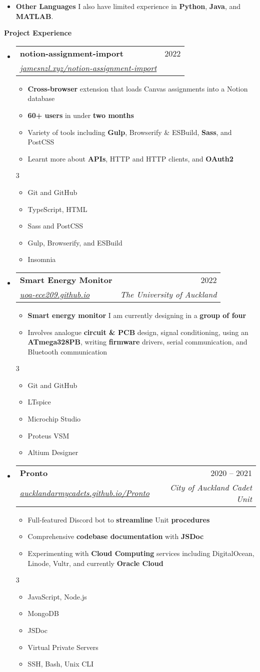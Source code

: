 \documentclass[11pt,a4paper]{article}[leftmargin=*]
\makeatletter
\def \entryspacing {-0pt}
\renewcommand{\section}[2]{\vspace{5pt}
  \colorbox{secondary}{\color{white}\raggedbottom\normalsize\textbf{{#1}{\hspace{2pt}#2}}}
}
\newcommand{\resumeEntryStart}{\begin{itemize}[leftmargin=2.5mm]}
\newcommand{\resumeEntryEnd}{\end{itemize}\vspace{\entryspacing}}
\newcommand{\resumeItemListStart}{\begin{itemize}[leftmargin=4.5mm]}
\newcommand{\resumeItemListEnd}{\end{itemize}}
\newcommand{\resumeItemListStartColumns}[2][-0.5]{\vspace*{#1\multicolsep}
\begin{multicols}{#2}\begin{itemize}[leftmargin=4.5mm]}
\newcommand{\resumeItemListEndColumns}[1][-1]{\end{itemize}\end{multicols}\vspace*{#1\multicolsep}}
\newcommand{\resumeItem}[1]{
  \item\small{
    {#1 \vspace{-2pt}}
  }
}
\newcommand{\resumeEntryTSDL}[4]{
  \vspace{-1pt}\item[]
    \begin{tabularx}{0.97\textwidth}{X@{\hspace{60pt}}r}
      \textbf{\color{primary}#1} & {\firabook\color{accent}\small#2} \\
      \textit{\color{accent}\small#3} & \textit{\color{accent}\small#4} \\
    \end{tabularx}\vspace{-6pt}
}
\newcommand{\resumeEntryS}[2]{
  \item[]\small{
    \textbf{\color{primary}#1 }{ #2 \vspace{-2pt}}
  }
}
\newcommand{\resumeBf}[1]{\small\textbf{\color{halfbold}#1}}
\makeatother
\begin{document}
\resumeEntryStart
\resumeEntryS
{Other Languages}{I also have limited experience in \resumeBf{Python}, \resumeBf{Java}, and \resumeBf{MATLAB}.}
\resumeEntryEnd


\section{\faFlask}{Project Experience}

\resumeEntryStart
\resumeEntryTSDL
{notion-assignment-import}{2022}
{\href{https://jamesnzl.xyz/notion-assignment-import}{jamesnzl.xyz/notion-assignment-import}}{}
\resumeItemListStart
\resumeItem {\resumeBf{Cross-browser} extension that loads Canvas assignments into a Notion database}
\resumeItem {\resumeBf{60+ users} in under \resumeBf{two months}}
\resumeItem {Variety of tools including \resumeBf{Gulp}, Browserify \& ESBuild, \resumeBf{Sass}, and PostCSS}
\resumeItem {Learnt more about \resumeBf{APIs}, HTTP and HTTP clients, and \resumeBf{OAuth2}}
\resumeItemListEnd
\resumeItemListStartColumns{3}
\resumeItem {Git and GitHub}
\resumeItem {TypeScript, HTML}
\resumeItem {Sass and PostCSS}
\resumeItem {Gulp, Browserify, and ESBuild}
\resumeItem {Insomnia}
\resumeItemListEndColumns
\resumeEntryEnd

\resumeEntryStart
\resumeEntryTSDL
{Smart Energy Monitor}{2022}
{\href{https://uoa-ece209.github.io}{uoa-ece209.github.io}}{The University of Auckland}
\resumeItemListStart
\resumeItem {\resumeBf{Smart energy monitor} I am currently designing in a \resumeBf{group of four}}
\resumeItem {Involves analogue \resumeBf{circuit \& PCB} design, signal conditioning, using an \resumeBf{ATmega328PB}, writing \resumeBf{firmware} drivers, serial communication, and Bluetooth communication}
\resumeItemListEnd
\resumeItemListStartColumns{3}
\resumeItem {Git and GitHub}
\resumeItem {LTspice}
\resumeItem {Microchip Studio}
\resumeItem {Proteus VSM}
\resumeItem {Altium Designer}
\resumeItemListEndColumns
\resumeEntryEnd

\pagebreak

\resumeEntryStart
\resumeEntryTSDL
{Pronto}{2020 -- 2021}
{\href{https://aucklandarmycadets.github.io/Pronto/}{aucklandarmycadets.github.io/Pronto}}{City of Auckland Cadet Unit}
\resumeItemListStart
\resumeItem {Full-featured Discord bot to \resumeBf{streamline} Unit \resumeBf{procedures}}
\resumeItem {Comprehensive \resumeBf{codebase documentation} with \resumeBf{JSDoc}}
\resumeItem {Experimenting with \resumeBf{Cloud Computing} services including DigitalOcean, Linode, Vultr, and currently \resumeBf{Oracle Cloud}}
\resumeItemListEnd
\resumeItemListStartColumns{3}
\resumeItem {JavaScript, Node.js}
\resumeItem {MongoDB}
\resumeItem {JSDoc}
\resumeItem {Virtual Private Servers}
\resumeItem {SSH, Bash, Unix CLI}
\resumeItemListEndColumns
\resumeEntryEnd
\end{document}
